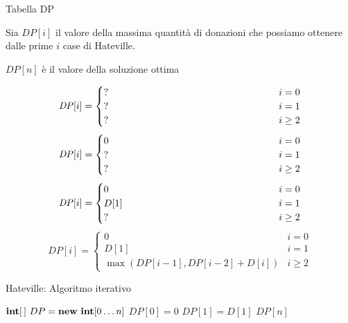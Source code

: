 \begin{frame}{Tabella DP}

\vspace{-9pt}
\begin{myboxtitle}
\BIL
\item Sia $\mathit{DP}[i]$ il \alert{valore} della massima quantità di donazioni che possiamo
ottenere dalle prime $i$ case di Hateville. 
\item $\mathit{DP}[n]$ è il valore della soluzione ottima
\EIL
\end{myboxtitle}

\begin{overprint}
\[
  \mathit{DP}[i] =
  \begin{cases}
   \makebox[6cm][l]{?} & i = 0 \\
   \makebox[6cm][l]{?} & i = 1 \\
   \makebox[6cm][l]{?} & i \geq 2 
   \end{cases}
\]
\[
  \mathit{DP}[i] =
  \begin{cases}
   0 & i = 0 \\
  \makebox[6cm][l]{?} & i = 1 \\
  \makebox[6cm][l]{?} & i \geq 2 
   \end{cases}
\]
\[
  \mathit{DP}[i] =
  \begin{cases}
   0 & i = 0 \\
   D[1] & i = 1 \\
  \makebox[6cm][l]{?} & i \geq 2 
   \end{cases}
\]
\[
  \mathit{DP}[i] =
  \begin{cases}
   0 & i = 0 \\
   D[1] & i = 1 \\
   \max(\mathit{DP}[i-1], \mathit{DP}[i-2] + D[i]) & i \geq 2 
   \end{cases}
\]
\end{overprint}

\end{frame}

\begin{frame}{Hateville: Algoritmo iterativo}

\vspace{-9pt}

\pause
\begin{Procedure}
\caption[A]{\textsf{hateville}($\INTEGER[\,]\ D$, \INTEGER $n$)}
$\INTEGER[\,]\ DP = \NEW\ \INTEGER[0 \ldots n]$\;
$\mathit{DP}[0] = 0$\;
$\mathit{DP}[1] = D[1]$\;
\Return $\mathit{DP}[n]$\;
\end{Procedure}

\end{frame}

